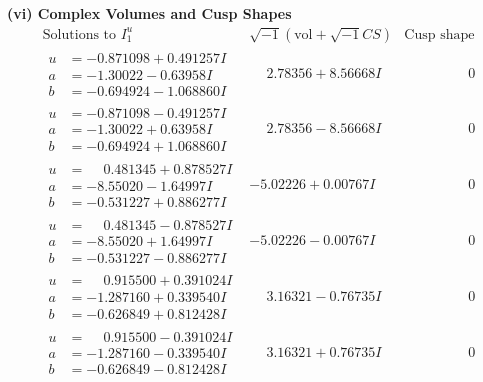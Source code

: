 \documentclass[1p]{elsarticle_modified}
\theoremstyle{definition}
\newcommand{\I}{\sqrt{-1}}
\begin{document}
\newpage\flushleft \textbf{(vi) Complex Volumes and Cusp Shapes}
$$\begin{array}{c|c|c}  
\text{Solutions to }I^u_{1}& \I (\text{vol} + \sqrt{-1}CS) & \text{Cusp shape}\\
 \hline 
\begin{aligned}
u &= -0.871098 + 0.491257 I \\
a &= -1.30022 - 0.63958 I \\
b &= -0.694924 - 1.068860 I\end{aligned}
 & \phantom{-}2.78356 + 8.56668 I & \phantom{-0.000000 } 0 \\ \hline\begin{aligned}
u &= -0.871098 - 0.491257 I \\
a &= -1.30022 + 0.63958 I \\
b &= -0.694924 + 1.068860 I\end{aligned}
 & \phantom{-}2.78356 - 8.56668 I & \phantom{-0.000000 } 0 \\ \hline\begin{aligned}
u &= \phantom{-}0.481345 + 0.878527 I \\
a &= -8.55020 - 1.64997 I \\
b &= -0.531227 + 0.886277 I\end{aligned}
 & -5.02226 + 0.00767 I & \phantom{-0.000000 } 0 \\ \hline\begin{aligned}
u &= \phantom{-}0.481345 - 0.878527 I \\
a &= -8.55020 + 1.64997 I \\
b &= -0.531227 - 0.886277 I\end{aligned}
 & -5.02226 - 0.00767 I & \phantom{-0.000000 } 0 \\ \hline\begin{aligned}
u &= \phantom{-}0.915500 + 0.391024 I \\
a &= -1.287160 + 0.339540 I \\
b &= -0.626849 + 0.812428 I\end{aligned}
 & \phantom{-}3.16321 - 0.76735 I & \phantom{-0.000000 } 0 \\ \hline\begin{aligned}
u &= \phantom{-}0.915500 - 0.391024 I \\
a &= -1.287160 - 0.339540 I \\
b &= -0.626849 - 0.812428 I\end{aligned}
 & \phantom{-}3.16321 + 0.76735 I & \phantom{-0.000000 } 0 \\ \hline\begin{aligned}

\end{aligned}
\end{array}$$
\end{document}
